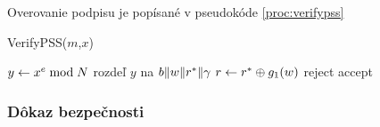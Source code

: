 Overovanie podpisu je popísané v pseudokóde \ref{proc:verifypss}

\begin{procedure}
    \caption{VerifyPSS($m$,$x$)}
    \label{proc:verifypss}
    $y \leftarrow x^e \bmod N$\;
    rozdeľ $y$ na $b \| w \| r^* \| \gamma$\;
    $r \leftarrow r^* \oplus g_1(w)$\;
    {%
        \Return reject\;
    }{%
        \Return accept\;
    }
\end{procedure}


\subsubsection{Dôkaz bezpečnosti}
